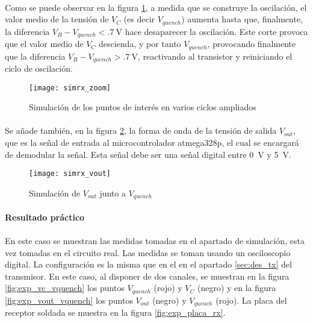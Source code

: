 \paragraph{}
Como se puede observar en la figura \ref{fig:simrx_zoom}, a medida que se construye la oscilación, el valor medio de la tensión de $V_{C}$ (es decir $V_{quench}$) aumenta hasta que, finalmente, la diferencia $V_B - V_{quench} < \SI{.7}{\volt}$ hace desaparecer la oscilaci\'on. Este corte provoca que el valor medio de $V_C$ descienda, y por tanto $V_{quench}$, provocando finalmente que la diferencia $V_B - V_{quench} > \SI{.7}{\volt}$, reactivando al transistor y reiniciando el ciclo de oscilaci\'on.

\begin{figure}[h!]
    \centering
    \texttt{[image: simrx\_zoom]}
    \caption{Simulación de los puntos de interés en varios ciclos ampliados}
    \label{fig:simrx_zoom}
\end{figure}

\paragraph{}
Se añade también, en la figura \ref{fig:simrx_vout}, la forma de onda de la tensión de salida $V_{out}$, que es la señal de entrada al microcontrolador atmega328p, el cual se encargará de demodular la señal. Esta señal debe ser una señal digital entre \SI{0}{\volt} y \SI{5}{\volt}.
\begin{figure}[h!]
    \centering
    \texttt{[image: simrx\_vout]}
    \caption{Simulación de $V_{out}$ junto a $V_{quench}$}
    \label{fig:simrx_vout}
\end{figure}

\paragraph{Resultado práctico} 
\paragraph{}
En este caso se muestran las medidas tomadas en el apartado de simulaci\'on, esta vez tomadas en el circuito real. Las medidas se toman usando un osciloscopio digital. 
La configuración es la misma que en el en el apartado \ref{sec:des_tx} del transmisor. En este caso, al disponer de dos canales, se muestran en la figura \ref{fig:exp_vc_vquench} los puntos $V_{quench}$ (rojo) y $V_{C}$ (negro) y en la figura \ref{fig:exp_vout_vquench} los puntos $V_{out}$ (negro) y $V_{quench}$ (rojo).
La placa del receptor soldada se muestra en la figura \ref{fig:exp_placa_rx}.

